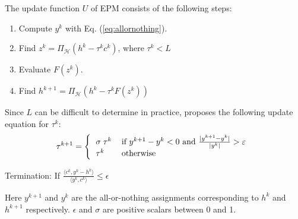 The update function $U$ of EPM consists of the following steps:

\begin{enumerate}
\item Compute $y^k$ with Eq. (\ref{eq:allornothing}).
\item Find $z^k = \Pi_\mathcal{H}(h^k - \tau^k c^k)$, where $\tau^k < L$ 
\item Evaluate $F(z^k)$.
\item Find $h^{k+1} = \Pi_\mathcal{H}(h^k - \tau^k F(z^k))$
\end{enumerate}
Since $L$ can be difficult to determine in practice, \cite{nie2010solving} proposes the following update equation for $\tau^k$:
\begin{equation}
\tau^{k+1} = \left\{
\begin{tabular}{ll}
$\sigma\;\tau^k$ & 
if $y^{k+1}-y^k < 0$ and $\frac{|y^{k+1}-y^k|}{|y^k|}> \epsilon$ \\
$\tau^k$ & otherwise
\end{tabular}
\right.
\end{equation}


Termination:  If ${\frac {\langle c^k,y^k-h^k \rangle} {\langle y^k, c^k\rangle}} \leq \epsilon$


Here $y^{k+1}$ and $y^k$ are the all-or-nothing assignments corresponding to $h^k$ and $h^{k+1}$ respectively. $\epsilon$ and $\sigma$ are positive scalars between 0 and 1.
